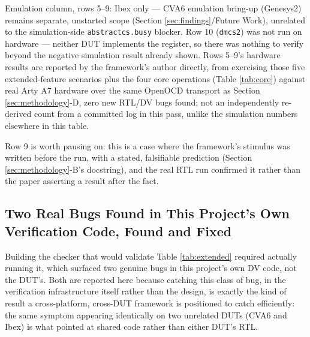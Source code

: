 \documentclass[conference]{IEEEtran}
\begin{document}
Emulation column, rows 5--9: Ibex only --- CVA6 emulation bring-up (Genesys2) remains separate, unstarted scope (Section \ref{sec:findings}/Future Work), unrelated to the simulation-side \texttt{abstractcs.busy} blocker. Row 10 (\texttt{dmcs2}) was not run on hardware --- neither DUT implements the register, so there was nothing to verify beyond the negative simulation result already shown. Rows 5--9's hardware results are reported by the framework's author directly, from exercising those five extended-feature scenarios plus the four core operations (Table \ref{tab:core}) against real Arty A7 hardware over the same OpenOCD transport as Section \ref{sec:methodology}-D, zero new RTL/DV bugs found; not an independently re-derived count from a committed log in this pass, unlike the simulation numbers elsewhere in this table.

Row 9 is worth pausing on: this is a case where the framework's stimulus was written before the run, with a stated, falsifiable prediction (Section \ref{sec:methodology}-B's docstring), and the real RTL run confirmed it rather than the paper asserting a result after the fact.

\subsection{Two Real Bugs Found in This Project's Own Verification Code, Found and Fixed}
\label{sec:bugs}

Building the checker that would validate Table \ref{tab:extended} required actually running it, which surfaced two genuine bugs in this project's own DV code, not the DUT's. Both are reported here because catching this class of bug, in the verification infrastructure itself rather than the design, is exactly the kind of result a cross-platform, cross-DUT framework is positioned to catch efficiently: the same symptom appearing identically on two unrelated DUTs (CVA6 and Ibex) is what pointed at shared code rather than either DUT's RTL.
\end{document}
